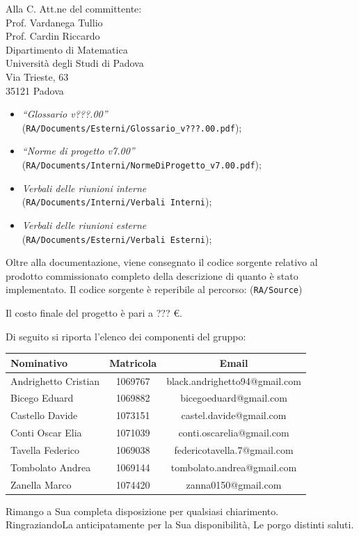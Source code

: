 \documentclass[a4paper,12pt]{letteracdp}
\begin{document}
\begin{letter}{
		Alla C. Att.ne del committente: \\
		Prof. Vardanega Tullio \\
		Prof. Cardin Riccardo \\
		Dipartimento di Matematica \\
		Università degli Studi di Padova \\
		Via Trieste, 63 \\
		35121 Padova}
\begin{itemize}
	\item \textit{“Glossario v???.00”} \\(\texttt{RA/Documents/Esterni/Glossario\_v???.00.pdf});
	
	\item \textit{“Norme di progetto v7.00”} \\(\texttt{RA/Documents/Interni/NormeDiProgetto\_v7.00.pdf});

	\item \textit{Verbali delle riunioni interne}	\\(\texttt{RA/Documents/Interni/Verbali Interni});
	
	\item \textit{Verbali delle riunioni esterne}	\\(\texttt{RA/Documents/Esterni/Verbali Esterni});
		
\end{itemize}

Oltre alla documentazione, viene consegnato il codice sorgente relativo al prodotto commissionato completo della descrizione di quanto è stato implementato. Il codice sorgente è reperibile al percorso: (\texttt{RA/Source})

Il costo finale del progetto è pari a ??? \euro.

Di seguito si riporta l'elenco dei componenti del gruppo:

\begin{center}
		\begin{tabular}{l c c}
			\toprule
			\textbf{Nominativo} & \textbf{Matricola} & \textbf{Email} \\
			\midrule
			Andrighetto Cristian & 1069767 & black.andrighetto94@gmail.com \\
			Bicego Eduard & 1069882 & bicegoeduard@gmail.com  \\
			Castello Davide	& 1073151 &	 castel.davide@gmail.com\\
			Conti Oscar Elia & 1071039 & conti.oscarelia@gmail.com \\
			Tavella Federico & 1069038 & federicotavella.7@gmail.com\\
			Tombolato Andrea & 1069144 & tombolato.andrea@gmail.com	 \\
			Zanella Marco & 1074420 & zanna0150@gmail.com \\
			\bottomrule
		\end{tabular}
\end{center}
		
		\closing{Rimango a Sua completa disposizione per qualsiasi chiarimento. \\
		RingraziandoLa anticipatamente per la Sua disponibilità, Le porgo distinti saluti.}
		
	\end{letter}
\end{document}
